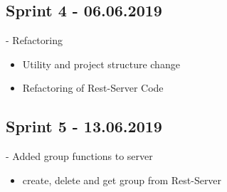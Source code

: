 \documentclass[12pt]{scrartcl}
\begin{document}
    \subsection{Sprint 4 - 06.06.2019}
    - Refactoring
    \begin{itemize}
        \item Utility and project structure change
        \item Refactoring of Rest-Server Code
    \end{itemize}

    \subsection{Sprint 5 - 13.06.2019}
    - Added group functions to server
    \begin{itemize}
        \item create, delete and get group from Rest-Server
    \end{itemize}

\end{document}
